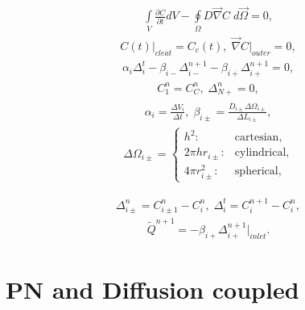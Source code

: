 \documentclass[a4paper,12pt]{extreport}
\begin{document}
    \begin{eqnarray}
        \label{eq:conductivity_integral}
        \int \limits_{V} \frac{\partial C}{\partial t} d V - \oint \limits_{\Omega} D \vec{\nabla}C \; d\vec{\Omega} = 0,
    \end{eqnarray}
    \vspace{-0.5cm}
    \begin{eqnarray}
        \label{eq:conductivity_bound}
        C\left(t\right) \Big|_{cleat} = C_c \left(t\right), \;
        \vec{\nabla} C \Big|_{outer} = 0,
    \end{eqnarray}
    \begin{eqnarray}
        \label{eq:conductivity_num}
        \alpha_i \Delta^{t}_i - \beta_{i-}\Delta^{n+1}_{i-} - \beta_{i+}\Delta^{n+1}_{i+}= 0,
    \end{eqnarray}
    \begin{eqnarray}
        \label{eq:conductivity_bound_num}
        C_1^n = C_C^n, \; \Delta_{N+}^n = 0,
    \end{eqnarray}
    \begin{eqnarray}
        \label{eq:alpha_beta}
        \alpha_i = \frac{\Delta V_i}{\Delta t}, \;
        \beta_{i\pm} = \frac{\overline{D}_{i\pm} \Delta \Omega_{i\pm}}{\Delta L_{i\pm}},
    \end{eqnarray}
    \begin{eqnarray}
        \Delta \Omega_{i\pm} =\begin{cases}
                                  h^2: & \text{cartesian},\\
                                  2 \pi h r_{i\pm}: & \text{cylindrical},\\
                                  4 \pi r^2_{i\pm}: & \text{spherical},
        \end{cases}
    \end{eqnarray}

    \begin{eqnarray}
        \label{eq:delta_num}
        \Delta_{i\pm}^n = C_{i\pm1}^n - C_{i}^n, \;
        \Delta_i^{t} = C_i^{n+1} - C_i^{n},
    \end{eqnarray}
    \begin{eqnarray}
        \label{eq:Consumption_conductivity_integral}
        \tilde{Q}^{n+1} = - \beta_{i+}\Delta^{n+1}_{i+}\Big|_{inlet}.
    \end{eqnarray}

    \section*{PN and Diffusion coupled}
\end{document}
